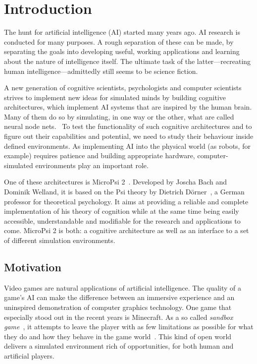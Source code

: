 \chapter{Introduction}
\label{chap:1}

The hunt for artificial intelligence (AI) started many years ago. AI research is conducted for many purposes. A rough separation of these can be made, by separating the goals into developing useful, working applications and learning about the nature of intelligence itself. The ultimate task of the latter---recreating human intelligence---admittedly still seems to be science fiction.

A new generation of cognitive scientists, psychologists and computer scientists strives to implement new ideas for simulated minds by building cognitive architectures, which implement AI systems that are inspired by the human brain. Many of them do so by simulating, in one way or the other, what are called neural node nets.~\cite{Goertzel201030} To test the functionality of such cognitive architectures and to figure out their capabilities and potential, we need to study their behaviour inside defined environments. As implementing AI into the physical world (as robots, for example) requires patience and building appropriate hardware, computer-simulated environments play an important role.

One of these architectures is MicroPsi 2~\cite{conf/agi/Bach12}. Developed by Joscha Bach and Dominik Welland, it is based on the Psi theory by Dietrich Dörner~\cite{Doerner1998}, a German professor for theoretical psychology. It aims at providing a reliable and complete implementation of his theory of cognition while at the same time being easily accessible, understandable and modifiable for the research and applications to come. MicroPsi 2 is both: a cognitive architecture as well as an interface to a set of different simulation environments.

\section{Motivation}

Video games are natural applications of artificial intelligence. The quality of a game's AI can make the difference between an immersive experience and an uninspired demonstration of computer graphics technology. One game that especially stood out in the recent years is Minecraft. As a so called \emph{sandbox game}~\cite{Duncan:2011:MBC:2207096.2207097}, it attempts to leave the player with as few limitations as possible for what they do and how they behave in the game world~\cite{doi:10.1162/dmal.9780262693646.167}. This kind of open world delivers a simulated environment rich of opportunities, for both human and artificial players. 

